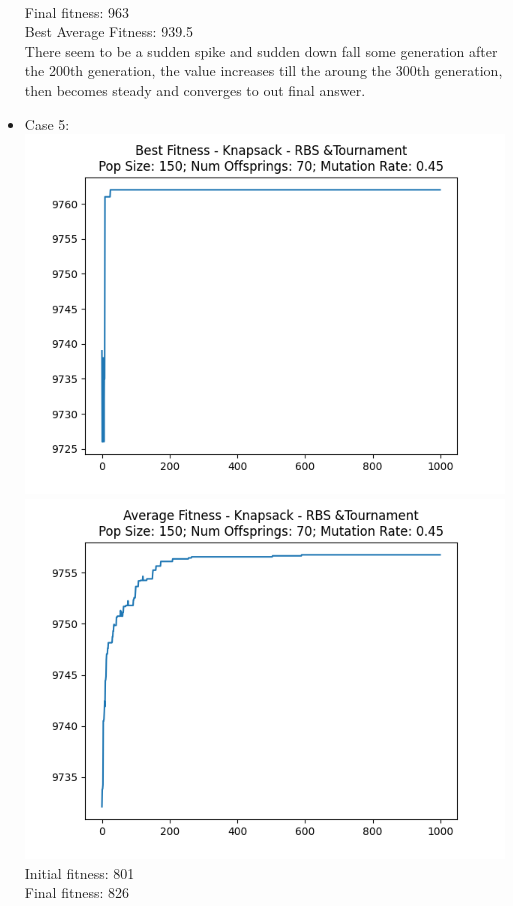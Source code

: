 \documentclass[12pt]{report} %
\begin{document}
\begin{itemize}
	      \\Final fitness:  963
	      \\Best Average Fitness: 939.5
	      \\ There seem to be a sudden spike and sudden down fall some generation after the 200th generation, the value increases till the aroung the 300th generation, then becomes steady and converges to out final answer.
	\item Case 5:\\
	      \includegraphics[scale=0.5]{../Analysis/BSF_Knapsack_1_2_150_70.png}
	      \includegraphics[scale=0.5]{../Analysis/ASF_Knapsack_1_2_150_70.png}
	      \\Initial fitness:  801
	      \\Final fitness:  826

\end{itemize}
\end{document}
